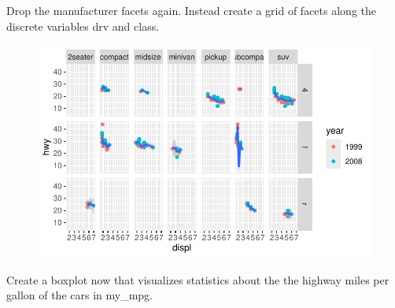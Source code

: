 \documentclass[
  letterpaper,
  DIV=11,
  numbers=noendperiod]{scrartcl}
\newenvironment{Shaded}{\begin{snugshade}}{\end{snugshade}}
\newcommand{\AttributeTok}[1]{\textcolor[rgb]{0.40,0.45,0.13}{#1}}
\newcommand{\FunctionTok}[1]{\textcolor[rgb]{0.28,0.35,0.67}{#1}}
\newcommand{\NormalTok}[1]{\textcolor[rgb]{0.00,0.23,0.31}{#1}}
\newcommand{\OtherTok}[1]{\textcolor[rgb]{0.00,0.23,0.31}{#1}}
\newcommand{\SpecialCharTok}[1]{\textcolor[rgb]{0.37,0.37,0.37}{#1}}
\begin{document}
Drop the manufacturer facets again. Instead create a grid of facets
along the discrete variables drv and class.

\begin{Shaded}
\end{Shaded}

\begin{figure}[H]

{\centering \includegraphics{Part1_Lecture1_Ex_files/figure-pdf/unnamed-chunk-33-1.pdf}

}

\end{figure}

Create a boxplot now that visualizes statistics about the the highway
miles per gallon of the cars in my\_mpg.
\end{document}
